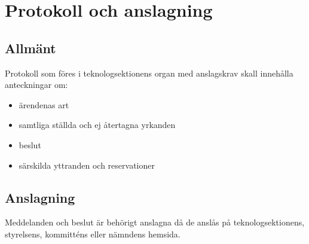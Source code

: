 \section{Protokoll och anslagning}

\subsection{Allmänt}
Protokoll som föres i teknologsektionens organ med anslagskrav skall innehålla anteckningar om:
\begin{itemize}
	\item ärendenas art
	\item samtliga ställda och ej återtagna yrkanden
	\item beslut
	\item särskilda yttranden och reservationer
\end{itemize}

\subsection{Anslagning}
\label{sec:protokoll:anslagning}
Meddelanden och beslut är behörigt anslagna då de anslås på teknologsektionens, styrelsens, kommitténs eller nämndens hemsida.